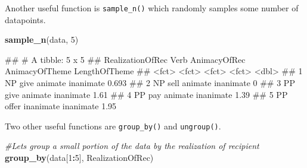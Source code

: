 \documentclass[
]{book}
\newenvironment{Shaded}{\begin{snugshade}}{\end{snugshade}}
\newcommand{\CommentTok}[1]{\textcolor[rgb]{0.56,0.35,0.01}{\textit{#1}}}
\newcommand{\DecValTok}[1]{\textcolor[rgb]{0.00,0.00,0.81}{#1}}
\newcommand{\FunctionTok}[1]{\textcolor[rgb]{0.13,0.29,0.53}{\textbf{#1}}}
\newcommand{\NormalTok}[1]{#1}
\newcommand{\SpecialCharTok}[1]{\textcolor[rgb]{0.81,0.36,0.00}{\textbf{#1}}}
\begin{document}
Another useful function is \texttt{sample\_n()} which randomly samples some number of datapoints.

\begin{Shaded}
\begin{Highlighting}[]
\FunctionTok{sample\_n}\NormalTok{(data, }\DecValTok{5}\NormalTok{)}
\end{Highlighting}
\end{Shaded}

\begin{Shaded}
\begin{Highlighting}[]
\NormalTok{\#\# \# A tibble: 5 x 5}
\NormalTok{\#\#   RealizationOfRec Verb  AnimacyOfRec AnimacyOfTheme LengthOfTheme}
\NormalTok{\#\#   \textless{}fct\textgreater{}            \textless{}fct\textgreater{} \textless{}fct\textgreater{}        \textless{}fct\textgreater{}                  \textless{}dbl\textgreater{}}
\NormalTok{\#\# 1 NP               give  animate      inanimate              0.693}
\NormalTok{\#\# 2 NP               sell  animate      inanimate              0    }
\NormalTok{\#\# 3 PP               give  animate      inanimate              1.61 }
\NormalTok{\#\# 4 PP               pay   animate      inanimate              1.39 }
\NormalTok{\#\# 5 PP               offer inanimate    inanimate              1.95}
\end{Highlighting}
\end{Shaded}

Two other useful functions are \texttt{group\_by()} and \texttt{ungroup()}.

\begin{Shaded}
\begin{Highlighting}[]
\CommentTok{\#Let\textquotesingle{}s group a small portion of the data by the realization of recipient}
\FunctionTok{group\_by}\NormalTok{(data[}\DecValTok{1}\SpecialCharTok{:}\DecValTok{5}\NormalTok{], RealizationOfRec)}
\end{Highlighting}
\end{Shaded}
\end{document}
